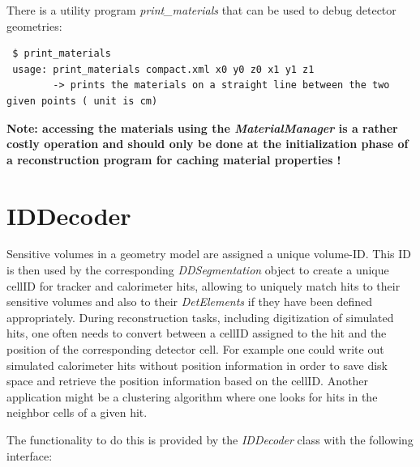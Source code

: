 \documentclass[10pt,a4paper]{article}
\begin{document}
\noindent
There is a utility program {\em print\_materials} that can be used to debug detector
geometries:

\begin{verbatim}
 $ print_materials
 usage: print_materials compact.xml x0 y0 z0 x1 y1 z1
        -> prints the materials on a straight line between the two given points ( unit is cm)
\end{verbatim}


\noindent
{\bf Note: accessing the materials using the {\em MaterialManager} is a rather
costly operation and should only be done at the initialization phase 
of a reconstruction program for caching material properties !}



\section{IDDecoder}
\label{sec:ddrec-manual-iddecoder}
Sensitive volumes in a \DDH geometry model are assigned a unique volume-ID. 
This ID is then used by the corresponding {\em DDSegmentation} object
to create a unique cellID for tracker and calorimeter hits, allowing
to uniquely match hits to their sensitive volumes and also to their
{\em DetElements} if they have been defined appropriately.
During reconstruction tasks, including digitization of simulated hits,
one often needs to convert between a cellID assigned to the hit and 
the position of the corresponding detector cell. 
For example one could write out simulated calorimeter hits without position
information in order to save disk space and retrieve the position information
based on the cellID. Another application might be a clustering algorithm
where one looks for hits in the neighbor cells of a given hit.

\noindent
The functionality to do this is provided by the {\em IDDecoder} class with
the following interface:
\end{document}
